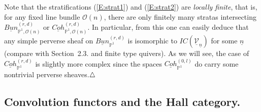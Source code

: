\documentclass[a4paper,10pt]{amsart}
\def\endexample{$\hfill \triangle$}
\def\endexample{$\hfill \triangle$}
\numberwithin{equation}{section}
\begin{document}
Note that the stratifications (\ref{E:strat1}) and (\ref{E:strat2}) are \textit{locally finite}, that is, for any fixed line bundle $\mathcal{O}(n)$, there are only finitely many stratas intersecting $\underline{Bun}^{(r,d)}_{\mathbb{P}^1, \mathcal{O}(n)}$ or $\underline{Coh}^{(r,d)}_{\mathbb{P}^1, \mathcal{O}(n)}$. In particular, from this one can easily deduce that any simple perverse sheaf on $\underline{Bun}^{(r,d)}_{\mathbb{P}^1}$ is isomorphic to $IC(\underline{\mathcal{V}}_{\underline{n}})$ for some $\underline{n}$ (compare with Section~2.3. and finite type quivers). As we will see, the case of $\underline{Coh}^{(r,d)}_{\mathbb{P}^1}$ is slightly more complex since the spaces $\underline{Coh}^{(0,l)}_{\mathbb{P}^1}$ do carry some nontrivial perverse sheaves.\endexample

\vspace{.3in}

\subsection{Convolution functors and the Hall category.}

\vspace{.15in}
\end{document}
